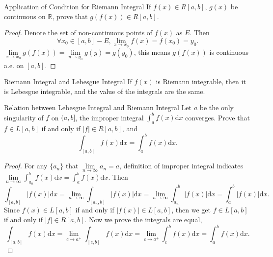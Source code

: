 \begin{example}{Application of Condition for Riemann Integral}{}
  If $f(x) \in R[a, b]$, $g(x)$ be continuous on $\mathbb{R}$,
  prove that $g(f(x)) \in R[a, b]$.
\end{example}

\begin{proof}
  Denote the set of non-continuous points of $f(x)$ as $E$.
  Then
  \begin{equation}
    \forall x_0 \in [a, b] - E, \lim \limits _{x \rightarrow x_0} f(x) = f(x_0) = y_0.
  \end{equation}
  $\lim \limits _{x \rightarrow x_0}g(f(x)) = \lim \limits _{y \rightarrow y_0}g(y) = g(y_0)$,
  this means $g(f(x))$ is continuous a.e. on $[a, b]$.
\end{proof}

\begin{theorem}{Riemann Integral and Lebesgue Integral}{}
  If $f(x)$ is Riemann integrable, then it is Lebesgue integrable,
  and the value of the integrals are the same.
\end{theorem}

\begin{example}{Relation between Lebesgue Integral and Riemann Integral}{}
  Let $a$ be the only singularity of $f$ on $(a, b]$,
  the improper integral $\int_a^b f(x)\mathrm{d} x$ converges.
  Prove that $f \in L[a, b]$ if and only if $|f| \in R[a, b]$,
  and 
  \begin{equation}
    \int_{[a,b]} f(x)\mathrm{d} x = \int_a^b f(x)\mathrm{d} x.
  \end{equation}
\end{example}

\begin{proof}
  For any $\{a_n\}$ that $\lim \limits _{n \rightarrow \infty} a_n = a$,
  definition of improper integral indicates
  $\lim \limits _{n \rightarrow \infty} \int_{a_n}^b f(x)\mathrm{d} x = \int_a^b f(x)\mathrm{d} x$.
  Then
  \begin{equation}
    \int_{[a, b]} |f(x)|\mathrm{d} x = \lim \limits _{n \rightarrow \infty} \int_{[a_n, b]} |f(x)|\mathrm{d} x
    = \lim \limits _{n \rightarrow \infty} \int_{a_n}^b |f(x)|\mathrm{d} x = \int_a^b |f(x)| \mathrm{d} x.
  \end{equation}
  Since $f(x) \in L[a, b]$ if and only if $|f(x)| \in L[a, b]$, then we get $f \in L[a,b]$ if and only if $|f| \in R[a,b]$.
  Now we prove the integrals are equal,
  \begin{equation}
    \int_{[a,b]}f(x)\mathrm{d} x= \lim \limits _{c \rightarrow a^+} \int_{[c,b]}f(x)\mathrm{d} x
    = \lim \limits _{c \rightarrow a^+}\int_c^b f(x)\mathrm{d} x = \int_a^b f(x)\mathrm{d} x.
  \end{equation}
\end{proof}

